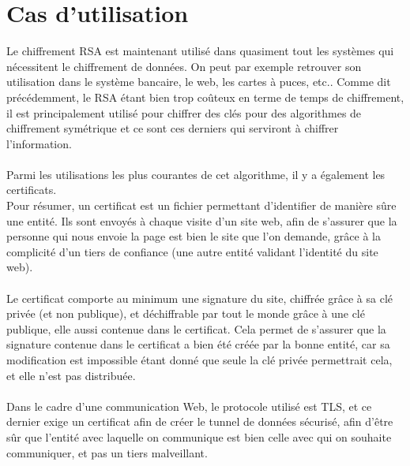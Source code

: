 	\section{Cas d'utilisation}
		Le chiffrement RSA est maintenant utilisé dans quasiment tout les systèmes qui nécessitent le chiffrement de données. On peut par exemple retrouver son utilisation dans le système bancaire, le web, les cartes à puces, etc..
		Comme dit précédemment, le RSA étant bien trop coûteux en terme de temps de chiffrement, il est principalement utilisé pour chiffrer des clés pour des algorithmes de chiffrement symétrique et ce sont ces derniers qui serviront à chiffrer l'information.\\
		\\
		Parmi les utilisations les plus courantes de cet algorithme, il y a également les certificats.\\
		Pour résumer, un certificat est un fichier permettant d'identifier de manière sûre une entité. Ils sont envoyés à chaque visite d'un site web, afin de s'assurer que la personne qui nous envoie la page est bien le site que l'on demande, grâce à la complicité d'un tiers de confiance (une autre entité validant l'identité du site web).\\
		\\
		Le certificat comporte au minimum une signature du site, chiffrée grâce à sa clé privée (et non publique), et déchiffrable par tout le monde grâce à une clé publique, elle aussi contenue dans le certificat. Cela permet de s'assurer que la signature contenue dans le certificat a bien été créée par la bonne entité, car sa modification est impossible étant donné que seule la clé privée permettrait cela, et elle n'est pas distribuée.\\
		\\
		Dans le cadre d'une communication Web, le protocole utilisé est TLS, et ce dernier exige un certificat afin de créer le tunnel de données sécurisé, afin d'être sûr que l'entité avec laquelle on communique est bien celle avec qui on souhaite communiquer, et pas un tiers malveillant.